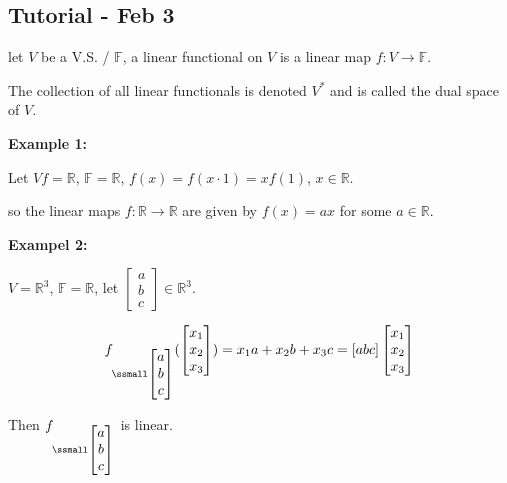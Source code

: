 \documentclass[12pt]{article}
\newcommand{\mR}{{\mathbb{R}}}
\newcommand{\mF}{{\mathbb{F}}}
\begin{document}
		

		\newpage
		\subsection{Tutorial - Feb 3}
		
		let $V$ be a V.S. / $\mF$, a linear functional on $V$ is a linear 
		map $f: V \to \mF$. 

		The collection of all linear functionals is denoted $V^*$ and is called
		the dual space of $V$. 
		
		{\color{Brown}
			\textbf{Example 1: }

			Let $Vf = \mR$, $\mF = \mR$, $f(x)= f(x\cdot 1)= xf(1)$, 
			$x \in \mR$. 

			so the linear maps $f: \mR \to \mR$ are given by $f(x) = ax$ 
			for some $a \in \mR$. 

			\textbf{Exampel 2: }

			$V = \mR^3$, $\mF = \mR$, let $\begin{bmatrix}
				a\\
				b\\
				c
			\end{bmatrix} \in \mR^3$. 

			\[
				f_{\ssmall\begin{bmatrix}
				a\\
				b\\
				c
			\end{bmatrix}}(\begin{bmatrix}
			x_1\\
			x_2\\
			x_3
		\end{bmatrix}) = x_1a+x_2b+x_3c = [a b c] 
		\begin{bmatrix}
			x_1\\
			x_2\\
			x_3
		\end{bmatrix}
		\]

		Then $f_{\ssmall\begin{bmatrix}
				a\\
				b\\
				c
			\end{bmatrix}}$ is linear. 

		}
\end{document}
